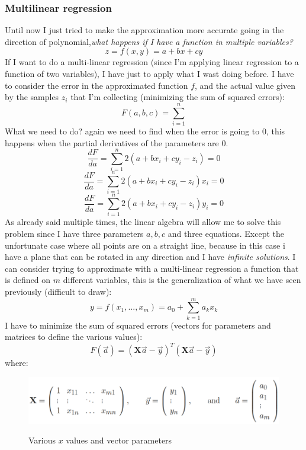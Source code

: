 \documentclass{article}
\begin{document}
\subsubsection{Multilinear regression}
Until now I just tried to make the approximation more accurate going in the
direction of polynomial,\textit{what happens if I have a function in multiple variables?}
$$z=f(x,y)=a+bx+cy$$
If I want to do a multi-linear regression (since I'm applying linear regression to a function
of two variables), I have just to apply what I wast doing before.
\newline\newline
I have to consider the error in the approximated function $f$, and the actual value given
by the samples $z_i$ that I'm collecting (minimizing the sum of squared errors):
$$F(a,b,c)=\sum_{i=1}^{n}$$
What we need to do? again we need to find when the error is going to $0$, this happens when
the partial derivatives of the parameters are $0$.
$$\frac{dF}{da}=\sum_{i=1}^n 2(a+bx_i+cy_i-z_i)=0$$
$$\frac{dF}{da}=\sum_{i=1}^n 2(a+bx_i+cy_i-z_i)x_i=0$$
$$\frac{dF}{da}=\sum_{i=1}^n 2(a+bx_i+cy_i-z_i)y_i=0$$
As already said multiple times, the linear algebra will allow me to solve
this problem since I have three parameters $a,b,c$ and three equations.
\newline\newline
Except the unfortunate case where all points are on a straight line, because in this case
i have a plane that can be rotated in any direction and I have \textit{infinite solutions}.
\newline\newline
I can consider trying to approximate with a multi-linear regression a function that
is defined on $m$ different variables, this is the generalization of what we have
seen previously (difficult to draw):
$$y=f(x_1,...,x_m)=a_0+\sum_{k=1}^{m} a_k x_k$$
I have to minimize the sum of squared errors (vectors for parameters and matrices to define
the various values):
$$F(\vec{a})=(\textbf{X}\vec{a}-\vec{y})^T(\textbf{X}\vec{a}-\vec{y})$$
where:
\begin{figure}[H]
    \centering
    \includegraphics[scale=0.5]{images/parameters_multilinear_regre.png}
    \label{fig:infos_multilinear}
    \caption{Various $x$ values and vector parameters}
\end{figure}
\end{document}
